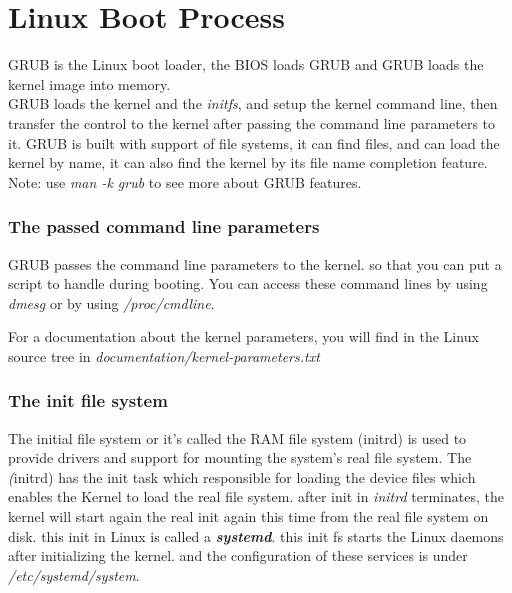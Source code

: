 \documentclass{article}
\begin{document}


\section{Linux Boot Process}
GRUB is the Linux boot loader, the BIOS loads GRUB and GRUB loads the kernel image into memory.\\

GRUB loads the kernel and the \textit{initfs}, and setup the kernel command line, then transfer the control to the kernel after passing the command line parameters to it.
GRUB is built with support of file systems, it can find files, and can load the kernel by name, it can also find the kernel by its file name completion feature.\\

Note: use \textit{man -k grub} to see more about GRUB features.


\subsubsection{The passed command line parameters}
GRUB passes the command line parameters to the kernel. so that you can put a script to handle during booting.
You can access these command lines by using \textit{dmesg} or by using \textit{/proc/cmdline}.

For a documentation about the kernel parameters, you will find in the Linux source tree in \textit{documentation/kernel-parameters.txt}

\subsubsection{The init file system}
The initial file system or it's called the RAM file system (initrd) is used to provide drivers and support for mounting the system's real file system. 
The \textit(initrd) has the init task which responsible for loading the device files which enables the Kernel to load the real file system.
after init in \textit{initrd} terminates, the kernel will start again the real init again this time from the real file system on disk.
this init in Linux is called a \textit{\textbf{systemd}}. this init fs starts the Linux daemons after initializing the kernel. and the configuration of these services is under \textit{/etc/systemd/system}.


\end{document}
